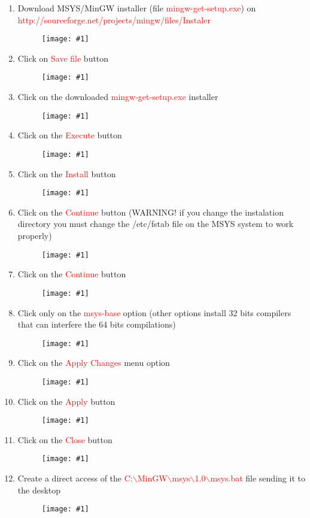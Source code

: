 \documentclass[a4paper]{article}
\newcommand{\FIGURE}[1]
{
	\begin{figure}[!ht]
	\centering
	\texttt{[image: \#1]}
	\end{figure}
}
\newcommand{\RED}[1] {\textcolor{red}{#1}}
\begin{document}
\begin{enumerate}

\item Download MSYS/MinGW installer (file \RED{mingw-get-setup.exe}) on \newline
\RED{http://sourceforge.net/projects/mingw/files/Instaler}

\FIGURE{msys-1.png.eps}

\item Click on \RED{Save file} button
\FIGURE{msys-2.png.eps}

\clearpage

\item Click on the downloaded \RED{mingw-get-setup.exe} installer
\FIGURE{msys-3.png.eps}

\item Click on the \RED{Execute} button
\FIGURE{msys-4.png.eps}

\clearpage

\item Click on the \RED{Install} button
\FIGURE{msys-5.png.eps}

\item Click on the \RED{Continue} button (WARNING! if you change the instalation
directory you must change the /etc/fstab file on the MSYS system to work
properly)
\FIGURE{msys-6.png.eps}

\clearpage

\item Click on the \RED{Continue} button
\FIGURE{msys-7.png.eps}

\item Click only on the \RED{msys-base} option (other options install 32 bits
compilers that can interfere the 64 bits compilations)
\FIGURE{msys-8.png.eps}

\clearpage

\item Click on the \RED{Apply Changes} menu option
\FIGURE{msys-9.png.eps}

\item Click on the \RED{Apply} button
\FIGURE{msys-10.png.eps}

\clearpage

\item Click on the \RED{Close} button
\FIGURE{msys-11.png.eps}

\item Create a direct access of the
\RED{C:$\backslash$MinGW$\backslash$msys$\backslash$1.0$\backslash$msys.bat}
file sending it to the desktop
\FIGURE{msys-12.png.eps}


\end{enumerate}
\end{document}
